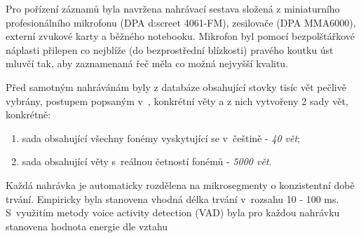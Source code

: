 
Pro pořízení záznamů byla navržena nahrávací sestava složená z miniaturního profesionálního mikrofonu (DPA d:screet 4061-FM), zesilovače (DPA MMA6000), externí zvukové karty a běžného notebooku. Mikrofon byl pomocí bezpolštářkové náplasti přilepen co nejblíže (do bezprostřední blízkosti) pravého koutku úst mluvčí tak, aby zaznamenaná řeč měla co možná nejvyšší kvalitu.

Před samotným nahrávánám byly z databáze obsahující stovky tisíc vět pečlivě vybrány, postupem popsaným v~\cite{Radova2000}, konkrétní věty a z nich vytvořeny 2 sady vět, konkrétně:

\begin{enumerate}
  \item sada obsahující všechny fonémy vyskytující se v~češtině - \textit{40 vět};
  \item sada obsahující věty s~reálnou četností fonémů - \textit{5000 vět}.
\end{enumerate}


Každá nahrávka je automaticky rozdělena na mikrosegmenty o konzistentní době trvání. Empiricky byla stanovena vhodná délka trvání v~rozsahu 10 - 100 ms. S~využitím metody voice activity detection (VAD) byla pro každou nahrávku stanovena hodnota energie dle vztahu

